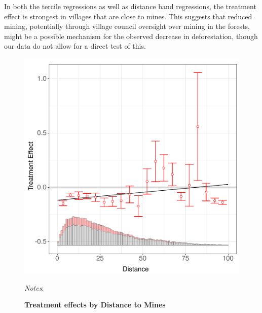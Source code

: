 \documentclass[12pt,reqno]{article}
\begin{document}

In both the tercile regressions as well as distance band regressions, the treatment effect is strongest in villages that are close to mines.  This suggests that reduced mining, potentially through village council oversight over mining in the forests, might be a possible mechanism for the observed decrease in deforestation, though our data do not allow for a direct test of this.

\begin{figure}[htbp!]
\begin{center}
\begin{minipage}{1 \linewidth}
  \caption{\textbf{Treatment effects by Distance to Mines}}
  \label{fig:mining_plot}	
\centerline{\includegraphics[width=4 in,angle=0]{Output/Interflex_main.pdf}}
\smallskip
\scriptsize
\emph{Notes}: 
\end{minipage}
\end{center}
\end{figure}
\end{document}

